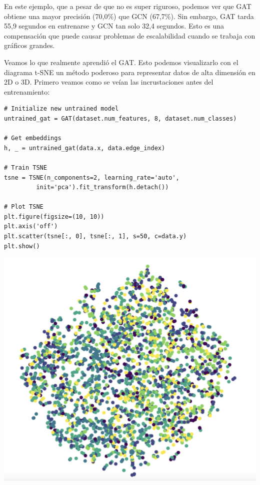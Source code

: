 \documentclass{article}
\begin{document}
\vspace{0.5cm}

En este ejemplo, que a pesar de que no es super riguroso, podemos ver que GAT obtiene una mayor precisión (70,0\%) que GCN (67,7\%). Sin embargo, GAT tarda 55,9 segundos en entrenarse y GCN tan solo 32,4 segundos. Esto es una compensación que puede causar problemas de escalabilidad cuando se trabaja con gráficos grandes.

Veamos lo que realmente aprendió el GAT. Esto podemos visualizarlo con el diagrama t-SNE un método poderoso para representar datos de alta dimensión en 2D o 3D. Primero veamos como se veían las incrustaciones antes del entrenamiento:

\vspace{0.5cm}

\begin{lstlisting}[style=mystyle]
# Initialize new untrained model
untrained_gat = GAT(dataset.num_features, 8, dataset.num_classes)

# Get embeddings
h, _ = untrained_gat(data.x, data.edge_index)

# Train TSNE
tsne = TSNE(n_components=2, learning_rate='auto',
         init='pca').fit_transform(h.detach())

# Plot TSNE
plt.figure(figsize=(10, 10))
plt.axis('off')
plt.scatter(tsne[:, 0], tsne[:, 1], s=50, c=data.y)
plt.show()
\end{lstlisting}

\vspace{0.5cm}

\begin{center}
    \includegraphics[width=0.75\linewidth]{img/noentrenado.png}
\end{center}
\end{document}
